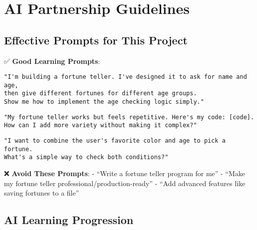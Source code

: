 \documentclass[
  letterpaper,
  DIV=11,
  numbers=noendperiod,
  oneside]{scrreprt}
\begin{document}
\section{AI Partnership Guidelines}\label{ai-partnership-guidelines}

\subsection{Effective Prompts for This
Project}\label{effective-prompts-for-this-project}

✅ \textbf{Good Learning Prompts}:

\begin{verbatim}
"I'm building a fortune teller. I've designed it to ask for name and age, 
then give different fortunes for different age groups. 
Show me how to implement the age checking logic simply."
\end{verbatim}

\begin{verbatim}
"My fortune teller works but feels repetitive. Here's my code: [code].
How can I add more variety without making it complex?"
\end{verbatim}

\begin{verbatim}
"I want to combine the user's favorite color and age to pick a fortune.
What's a simple way to check both conditions?"
\end{verbatim}

❌ \textbf{Avoid These Prompts}: - ``Write a fortune teller program for
me'' - ``Make my fortune teller professional/production-ready'' - ``Add
advanced features like saving fortunes to a file''

\subsection{AI Learning Progression}\label{ai-learning-progression}
\end{document}
